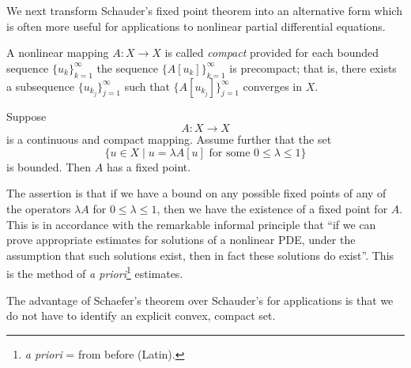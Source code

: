 We next transform Schauder's fixed point theorem into an alternative form which is often more useful for applications to nonlinear partial differential equations.

\begin{definition}
\label{def:compact-mapping-banach-space}
A nonlinear mapping $A : X \to X$ is called \textit{compact} provided for each bounded sequence $\{u_k\}_{k=1}^{\infty}$ the sequence $\{A[u_k]\}_{k=1}^{\infty}$ is precompact; that is, there exists a subsequence $\{u_{k_j}\}_{j=1}^{\infty}$ such that $\{A[u_{k_j}]\}_{j=1}^{\infty}$ converges in $X$.
\end{definition}

\begin{theorem}
\label{thm:schaefers-fixed-point-theorem}
Suppose
\[
A : X \to X
\]
is a continuous and compact mapping. Assume further that the set
\[
\{u \in X \mid u = \lambda A[u] \text{ for some } 0 \le \lambda \le 1\}
\]
is bounded. Then $A$ has a fixed point.
\end{theorem}

\begin{remark}
\label{rem:a-priori-estimates-method}
The assertion is that if we have a bound on any possible fixed points of any of the operators $\lambda A$ for $0 \le \lambda \le 1$, then we have the existence of a fixed point for $A$. This is in accordance with the remarkable informal principle that ``if we can prove appropriate estimates for solutions of a nonlinear PDE, under the assumption that such solutions exist, then in fact these solutions do exist''. This is the method of \textit{a priori}\footnote{\textit{a priori} = from before (Latin).} estimates.
\end{remark}

The advantage of Schaefer's theorem over Schauder's for applications is that we do not have to identify an explicit convex, compact set.

